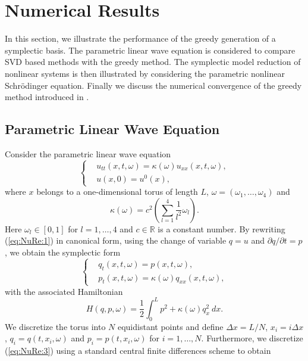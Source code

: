 \section{Numerical Results} \label{p1.sec:NuRe:1}
In this section, we illustrate the performance of the greedy generation of a symplectic basis. The parametric linear wave equation is considered to compare SVD based methods with the greedy method. The symplectic model reduction of nonlinear systems is then illustrated by considering the parametric nonlinear Schr\"odinger equation. Finally we discuss the numerical convergence of the greedy method introduced in .

\subsection{Parametric Linear Wave Equation} \label{chap:NuRe:1.1} Consider the parametric linear wave equation
\begin{equation} \label{eq:NuRe:1}
\left\{
\begin{aligned}
& u_{tt}(x,t,\omega) = \kappa(\omega) u_{xx}(x,t,\omega), \\
& u(x,0) = u^0(x),
\end{aligned}
\right.
\end{equation}
where $x$ belongs to a one-dimensional torus of length $L$, $\omega = (\omega_1,\dots,\omega_4)$ and
\begin{equation} \label{eq:NuRe:2}
	\kappa(\omega) = c^2\left( \sum_{l=1}^4 \frac{1}{l^2} \omega_l \right).
\end{equation}
Here $\omega_l \in [0,1]$ for $l=1,\dots,4$ and $c\in \mathbb{R}$ is a constant number. By rewriting (\ref{eq:NuRe:1}) in canonical form, using the change of variable $q = u$ and $\partial q/ \partial t= p$, we obtain the symplectic form
\begin{equation} \label{eq:NuRe:3}
\left\{
\begin{aligned}
& q_t(x,t,\omega) = p(x,t,\omega), \\
& p_t(x,t,\omega) = \kappa(\omega) q_{xx}(x,t,\omega),
\end{aligned}
\right.
\end{equation}
with the associated Hamiltonian
\begin{equation} \label{eq:NuRe:4}
	H(q,p,\omega) = \frac 1 2 \int_0^L p^2 + \kappa(\omega) q_x^2 \ dx.
\end{equation}
We discretize the torus into $N$ equidistant points and define $\Delta x = L/N$, $x_i = i\Delta x$, $q_i=q(t,x_i,\omega)$ and $p_i=p(t,x_i,\omega)$ for $i = 1, \dots, N$. Furthermore, we discretize (\ref{eq:NuRe:3}) using a standard central finite differences scheme to obtain
